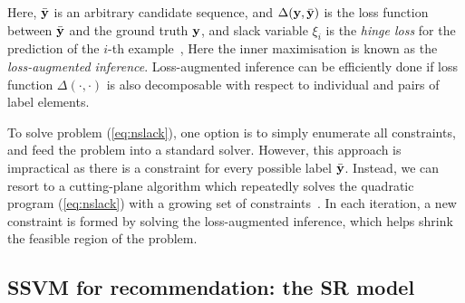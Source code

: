 Here, $\bar{\mathbf{y}}$ is an arbitrary candidate sequence,  %
and $\Delta(\mathbf{y}, \bar{\mathbf{y}})$ is the loss function between $\bar{\mathbf{y}}$ and the ground truth $\mathbf{y}$,
and slack variable $\xi_i$ is the \emph{hinge loss} for the prediction of the $i$-th example~\cite{tsochantaridis2005large},
Here the inner maximisation is known as the \emph{loss-augmented inference}.
Loss-augmented inference can be efficiently done if loss function $\Delta(\cdot,\cdot)$ is also decomposable
with respect to individual and pairs of label elements.

To solve problem (\ref{eq:nslack}), one option is to simply enumerate all constraints, and feed the problem into a standard solver.
However, this approach is impractical as there is a constraint for every possible label $\bar{\mathbf{y}}$.
Instead, we can resort to a cutting-plane algorithm which repeatedly solves the quadratic program (\ref{eq:nslack})
with a growing set of constraints~\cite{joachims2009predicting}.
In each iteration, a new constraint is formed by solving the loss-augmented inference,
which helps shrink the feasible region of the problem.

\secmoveup
\subsection{SSVM for recommendation: the SR model}
\label{ssec:sr}
\textmoveup


